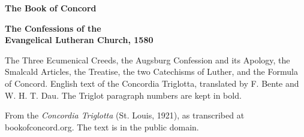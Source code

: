 \documentclass[11pt,letterpaper]{article}
\begin{document}
\color{ink}

\begin{titlepage}
\centering
\vspace*{4em}
{\LARGE\bfseries\color{heading} The Book of Concord\par}
\vspace{2em}
{\Large\bfseries\color{heading} The Confessions of the\\[0.2em]Evangelical Lutheran Church, 1580\par}
\vspace{2.5em}
{\itshape\color{subhead}\parbox{0.8\linewidth}{\centering The Three Ecumenical Creeds, the Augsburg Confession and its Apology, the Smalcald Articles, the Treatise, the two Catechisms of Luther, and the Formula of Concord. English text of the Concordia Triglotta, translated by F. Bente and W. H. T. Dau. The Triglot paragraph numbers are kept in bold.\par}}
\vfill
{\small From the \emph{Concordia Triglotta} (St. Louis, 1921), as transcribed at bookofconcord.org. The text is in the public domain.\par}
\vspace{2em}
\end{titlepage}

\tableofcontents


\end{document}
